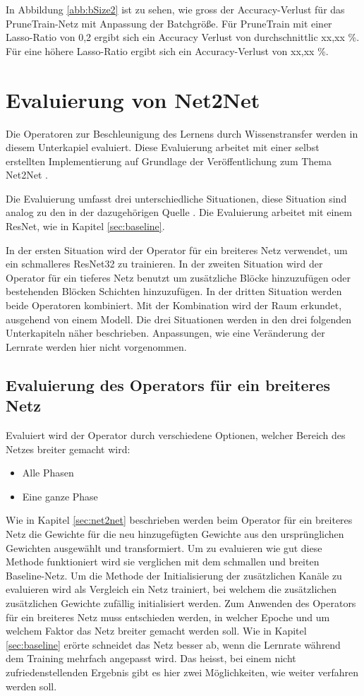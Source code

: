 In Abbildung \ref{abb:bSize2} ist zu sehen, wie gross der Accuracy-Verlust für das PruneTrain-Netz mit Anpassung der Batchgröße. Für PruneTrain mit einer Lasso-Ratio von 0,2 ergibt sich ein Accuracy Verlust von durchschnittlic xx,xx \%. Für eine höhere Lasso-Ratio ergibt sich ein Accuracy-Verlust von xx,xx \%.







\chapter{Evaluierung von Net2Net}\label{sec:net2netexperimente}
Die Operatoren zur Beschleunigung des Lernens durch Wissenstransfer werden in diesem Unterkapiel evaluiert. Diese Evaluierung arbeitet mit einer selbst erstellten Implementierung auf Grundlage der Veröffentlichung zum Thema Net2Net \cite{net2net}.

Die Evaluierung umfasst drei unterschiedliche Situationen, diese Situation sind analog zu den in der dazugehörigen Quelle \cite{net2net}. Die Evaluierung arbeitet mit einem ResNet, wie in Kapitel \ref{sec:baseline}.

In der ersten Situation wird der Operator für ein breiteres Netz verwendet, um ein schmalleres ResNet32 zu trainieren. 
In der zweiten Situation wird der Operator für ein tieferes Netz benutzt um zusätzliche Blöcke hinzuzufügen oder bestehenden Blöcken Schichten hinzuzufügen. In der dritten Situation werden beide Operatoren kombiniert. Mit der Kombination wird der Raum erkundet, ausgehend von einem Modell.
Die drei Situationen werden in den drei folgenden Unterkapiteln näher beschrieben. Anpassungen, wie eine Veränderung der Lernrate werden hier nicht vorgenommen.

\section{Evaluierung des Operators für ein breiteres Netz}
Evaluiert wird der Operator durch verschiedene Optionen, welcher Bereich des Netzes breiter gemacht wird:
\begin{itemize}
 \item Alle Phasen
 \item Eine ganze Phase
\end{itemize}
Wie in Kapitel \ref{sec:net2net} beschrieben werden beim Operator für ein breiteres Netz die Gewichte für die neu hinzugefügten Gewichte aus den ursprünglichen Gewichten ausgewählt und transformiert. Um zu evaluieren wie gut diese Methode funktioniert wird sie verglichen mit dem schmallen und breiten Baseline-Netz. Um die Methode der Initialisierung der zusätzlichen Kanäle zu evaluieren wird als Vergleich ein Netz trainiert, bei welchem die zusätzlichen zusätzlichen Gewichte zufällig initialisiert werden.
\color{blue1}
Zum Anwenden des Operators für ein breiteres Netz muss entschieden werden, in welcher Epoche und um welchem Faktor das Netz breiter gemacht werden soll. Wie in Kapitel \ref{sec:baseline} erörte schneidet das Netz besser ab, wenn die Lernrate während dem Training mehrfach angepasst wird. Das heisst, bei einem nicht zufriedenstellenden Ergebnis gibt es hier zwei Möglichkeiten, wie weiter verfahren werden soll.

